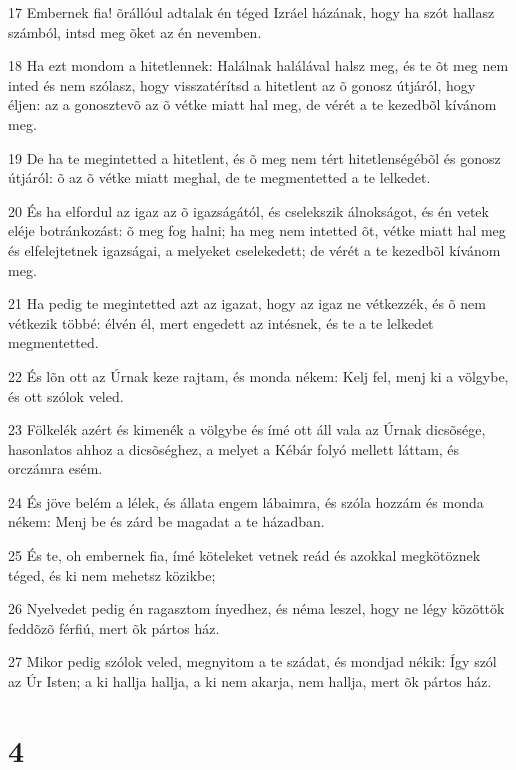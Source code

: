 \par 17 Embernek fia! õrállóul adtalak én téged Izráel házának, hogy ha szót hallasz számból, intsd meg õket az én nevemben.
\par 18 Ha ezt mondom a hitetlennek: Halálnak halálával halsz meg, és te õt meg nem inted és nem szólasz, hogy visszatérítsd a hitetlent az õ gonosz útjáról, hogy éljen: az a gonosztevõ az õ vétke miatt hal meg, de vérét a te kezedbõl kívánom meg.
\par 19 De ha te megintetted a hitetlent, és õ meg nem tért hitetlenségébõl és gonosz útjáról: õ az õ vétke miatt meghal, de te megmentetted a te lelkedet.
\par 20 És ha elfordul az igaz az õ igazságától, és cselekszik álnokságot, és én vetek eléje botránkozást: õ meg fog halni; ha meg nem intetted õt, vétke miatt hal meg és elfelejtetnek igazságai, a melyeket cselekedett; de vérét a te kezedbõl kívánom meg.
\par 21 Ha pedig te megintetted azt az igazat, hogy az igaz ne vétkezzék, és õ nem vétkezik többé: élvén él, mert engedett az intésnek, és te a te lelkedet megmentetted.
\par 22 És lõn ott az Úrnak keze rajtam, és monda nékem: Kelj fel, menj ki a völgybe, és ott szólok veled.
\par 23 Fölkelék azért és kimenék a völgybe és ímé ott áll vala az Úrnak dicsõsége, hasonlatos ahhoz a dicsõséghez, a melyet a Kébár folyó mellett láttam, és orczámra esém.
\par 24 És jöve belém a lélek, és állata engem lábaimra, és szóla hozzám és monda nékem: Menj be és zárd be magadat a te házadban.
\par 25 És te, oh embernek fia, ímé köteleket vetnek reád és azokkal megkötöznek téged, és ki nem mehetsz közikbe;
\par 26 Nyelvedet pedig én ragasztom ínyedhez, és néma leszel, hogy ne légy közöttök feddõzõ férfiú, mert õk pártos ház.
\par 27 Mikor pedig szólok veled, megnyitom a te szádat, és mondjad nékik: Így szól az Úr Isten; a ki hallja hallja, a ki nem akarja, nem hallja, mert õk pártos ház.

\chapter{4}

